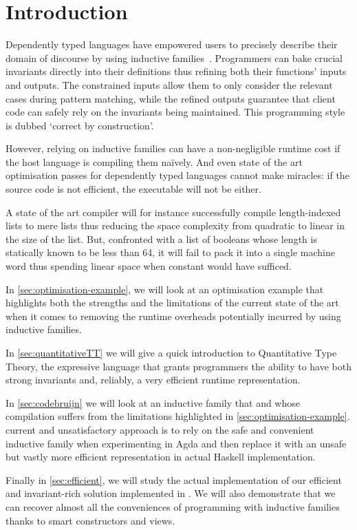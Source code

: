 
\section{Introduction}

Dependently typed languages have empowered users to precisely describe their domain
of discourse by using inductive families~\cite{DBLP:journals/fac/Dybjer94}.
%
Programmers can bake crucial invariants directly into their definitions thus refining
both their functions' inputs and outputs.
%
The constrained inputs allow them to only consider the relevant cases during pattern
matching, while the refined outputs guarantee that client code can safely rely on the
invariants being maintained.
%
This programming style is dubbed `correct by construction'.

However, relying on inductive families can have a non-negligible runtime cost if
the host language is compiling them naïvely. And even state of the art optimisation
passes for dependently typed languages cannot make miracles: if the source code is
not efficient, the executable will not be either.

A state of the art compiler will for instance successfully compile length-indexed
lists to mere lists thus reducing the space complexity from quadratic to linear
in the size of the list.
%
But, confronted with a list of booleans whose length is statically known to be
less than 64, it will fail to pack it into a single machine word thus spending
linear space when constant would have sufficed.

In \cref{sec:optimisation-example}, we will look at an optimisation example
that highlights both the strengths and the limitations of the current state
of the art when it comes to removing the runtime overheads potentially
incurred by using inductive families.

In \cref{sec:quantitativeTT} we will give a quick introduction to Quantitative
Type Theory, the expressive language that grants programmers the ability
to have both strong invariants and, reliably, a very efficient runtime
representation.

In \cref{sec:codebruijn} we will look at an inductive family that
\iftoggle{BLIND}
  {the \typos{} project~\cite{MANUAL:talk/types/Allais22}
    uses in a performance-critical way}
  {we use in a performance-critical way in the
    \typos{} project~\cite{MANUAL:talk/types/Allais22}}
and whose compilation suffers from the limitations highlighted in
\cref{sec:optimisation-example}.
%
\iftoggle{BLIND}{The project's authors}{Our}
current and unsatisfactory approach is to rely on the safe and convenient
inductive family when experimenting in Agda and then replace it with an unsafe
but vastly more efficient representation in
\iftoggle{BLIND}{their}{our} actual Haskell implementation.

Finally in \cref{sec:efficient}, we will study the actual implementation of
our efficient and invariant-rich solution implemented in \idris{}. We will
also demonstrate that we can recover almost all the conveniences of programming
with inductive families thanks to smart constructors and views.
